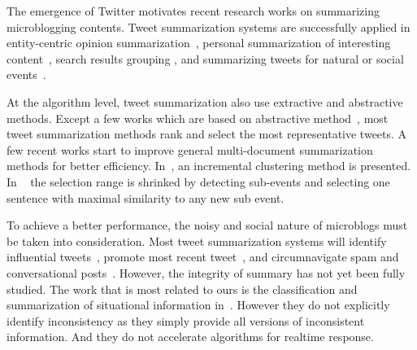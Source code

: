 \documentclass[envcountsame]{llncs}
\begin{document}


The emergence of Twitter motivates recent research works on summarizing microblogging contents. Tweet summarization systems are successfully applied in entity-centric opinion summarization~\cite{Meng2012Entitycentric}, personal summarization of interesting content~\cite{Ren2013Personalized,Chin2017TOTEM}, search results grouping \cite{Mathioudakis2010TwitterMonitor}, and summarizing tweets for natural or social events~\cite{Takamura2011Summarizing,Lin2012Generating,Rudra2015Extracting,Shou2013Sumblr,Liu2016LEDS,Gillani2017Post,Zubiaga2012Towards}.

At the algorithm level, tweet summarization also use extractive and abstractive methods. Except a few works which are based on abstractive method~\cite{Sharifi2010Summarizing}, most tweet summarization methods rank and select the most representative tweets. A few recent works start to improve general multi-document summarization methods for better efficiency. In~\cite{Shou2013Sumblr}, an incremental clustering method is presented. In ~\cite{Zubiaga2012Towards} the selection range is shrinked by detecting sub-events and selecting one sentence with maximal similarity to any new sub event.

To achieve a better performance, the noisy and social nature of microblogs must be taken into consideration. Most tweet summarization systems will identify influential tweets~\cite{Hannon2010Recommending},  promote most recent tweet~\cite{Efron2011Estimation}, and circumnavigate spam and conversational posts~\cite{Gillani2017Post}. However, the integrity of summary has not yet been fully studied. The work that is most related to ours is the 
classification and summarization of situational information in~\cite{Rudra2015Extracting,Rudra2016Summarizing}. However they do not explicitly identify inconsistency as they simply provide all versions of inconsistent information. And they do not accelerate algorithms for realtime response. 
\end{document}
